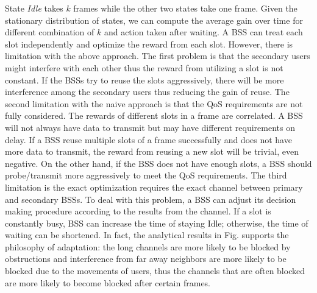 \documentclass[10pt, conference, letterpaper]{IEEEtran}
\begin{document}
State \emph{Idle} takes $k$ frames while the other two states take one frame.  Given the stationary distribution of states, we can compute the average gain over time for different combination of $k$ and action taken after waiting. A BSS can treat each slot independently and optimize the reward from each slot. However, there is limitation with the above approach. The first problem is that the secondary users might interfere with each other thus the reward from utilizing a slot is not constant. If the BSSs try to reuse the slots aggressively, there will be more interference among the secondary users thus reducing the gain of reuse. 
The second limitation with the naive approach is that the QoS requirements are not fully considered. The rewards of different slots in a frame are correlated. A BSS will not always have data to transmit but may have different requirements on delay. If a BSS reuse multiple slots of a frame successfully and does not have more data to transmit, the reward from reusing a new slot will be trivial, even negative. On the other hand, if the BSS does not have enough slots, a BSS should probe/transmit more aggressively to meet the QoS requirements.  
The third limitation is the exact optimization requires the exact channel between primary and secondary BSSs. To deal with this problem, a BSS can adjust its decision making procedure according to the results from the channel. If a slot is constantly busy, BSS can increase the time of staying Idle; otherwise, the time of waiting can be shortened. In fact, the analytical results in Fig. %
supports the philosophy of adaptation: the long channels are more likely to be blocked by obstructions and interference from far away neighbors are more likely to be blocked due to the movements of users, thus the channels that are often blocked are more likely to become blocked after certain frames. 
\end{document}
